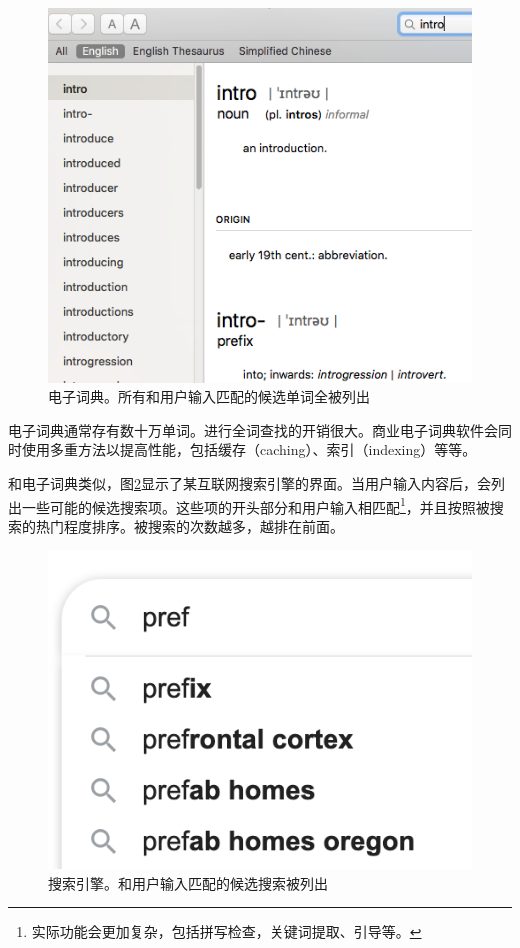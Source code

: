 \documentclass[b5paper]{ctexart}
\begin{document}
\begin{figure}[htbp]
  \centering
  \includegraphics[scale=0.5]{img/edict-en.png}
  \caption{电子词典。所有和用户输入匹配的候选单词全被列出}
  \label{fig:e-dict}
\end{figure}

电子词典通常存有数十万单词。进行全词查找的开销很大。商业电子词典软件会同时使用多重方法以提高性能，包括缓存（caching）、索引（indexing）等等。

和电子词典类似，图\ref{fig:word-completion}显示了某互联网搜索引擎的界面。当用户输入内容后，会列出一些可能的候选搜索项。这些项的开头部分和用户输入相匹配\footnote{实际功能会更加复杂，包括拼写检查，关键词提取、引导等。}，并且按照被搜索的热门程度排序。被搜索的次数越多，越排在前面。

\begin{figure}[htbp]
  \centering
  \includegraphics[scale=0.5]{img/adaptive-input.png}
  \caption{搜索引擎。和用户输入匹配的候选搜索被列出}
  \label{fig:word-completion}
\end{figure}
\end{document}
